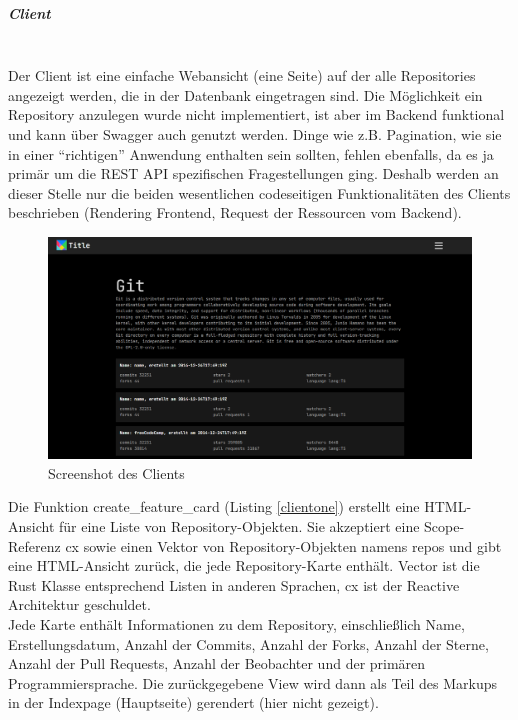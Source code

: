 \documentclass[notitlepage, hidelinks]{article}
\begin{document}
\subparagraph{Client} \mbox{} \\

Der Client ist eine einfache Webansicht (eine Seite) auf der alle Repositories angezeigt werden, die in der Datenbank eingetragen sind. Die Möglichkeit ein Repository anzulegen wurde nicht implementiert, ist aber im Backend funktional und kann über Swagger auch genutzt werden. Dinge wie z.B. Pagination, wie sie in einer ``richtigen'' Anwendung enthalten sein sollten, fehlen ebenfalls, da es ja primär um die REST API spezifischen Fragestellungen ging. Deshalb werden an dieser Stelle nur die beiden wesentlichen codeseitigen Funktionalitäten des Clients beschrieben (Rendering Frontend, Request der Ressourcen vom Backend).

\begin{figure}[H]
\centering
  \includegraphics[width=\textwidth]{images/client.png}
  \caption{Screenshot des Clients}
  \label{fig:clientscreenshot}
\end{figure}

Die Funktion create\_feature\_card (Listing \ref{clientone}) erstellt eine HTML-Ansicht für eine Liste von Repository-Objekten. Sie akzeptiert eine Scope-Referenz cx sowie einen Vektor von Repository-Objekten namens repos und gibt eine HTML-Ansicht zurück, die jede Repository-Karte enthält. Vector ist die Rust Klasse entsprechend Listen in anderen Sprachen, cx ist der Reactive Architektur geschuldet. \\
Jede Karte enthält Informationen zu dem Repository, einschließlich Name, Erstellungsdatum, Anzahl der Commits, Anzahl der Forks, Anzahl der Sterne, Anzahl der Pull Requests, Anzahl der Beobachter und der primären Programmiersprache. Die zurückgegebene View wird dann als Teil des Markups in der Indexpage (Hauptseite) gerendert (hier nicht gezeigt).
\end{document}
